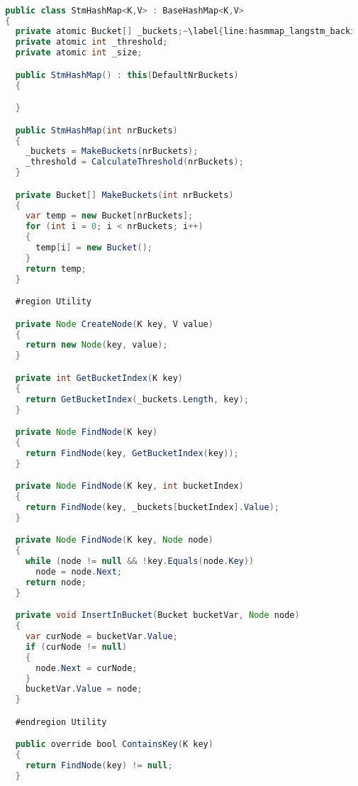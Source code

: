 \begin{lstlisting}[label=lst:impl_hasmap_lib,
  caption={\stmname Based Concurrent Hashmap Implementation},
  language=Java,  
  showspaces=false,
  showtabs=false,
  breaklines=true,
  showstringspaces=false,
  breakatwhitespace=true,
  commentstyle=\color{greencomments},
  keywordstyle=\color{bluekeywords},
  stringstyle=\color{redstrings},
  escapechar=~,
  morekeywords={atomic, retry, orelse, var, get, set, ref, out, readonly, virtual, override, region, endregion, foreach, lock}]  % Start your code-block

  public class StmHashMap<K,V> : BaseHashMap<K,V>
  {
    private atomic Bucket[] _buckets;~\label{line:hasmmap_langstm_backingarray}~
    private atomic int _threshold;
    private atomic int _size;

    public StmHashMap() : this(DefaultNrBuckets)
    {

    }

    public StmHashMap(int nrBuckets)
    {
      _buckets = MakeBuckets(nrBuckets);
      _threshold = CalculateThreshold(nrBuckets);
    }

    private Bucket[] MakeBuckets(int nrBuckets)
    {
      var temp = new Bucket[nrBuckets];
      for (int i = 0; i < nrBuckets; i++)
      {
        temp[i] = new Bucket();
      }
      return temp;
    }

    #region Utility

    private Node CreateNode(K key, V value)
    {
      return new Node(key, value);
    }

    private int GetBucketIndex(K key)
    {
      return GetBucketIndex(_buckets.Length, key);
    }

    private Node FindNode(K key)
    {
      return FindNode(key, GetBucketIndex(key));
    }

    private Node FindNode(K key, int bucketIndex)
    {
      return FindNode(key, _buckets[bucketIndex].Value);
    }

    private Node FindNode(K key, Node node)
    {
      while (node != null && !key.Equals(node.Key))
        node = node.Next;
      return node;
    }

    private void InsertInBucket(Bucket bucketVar, Node node)
    {
      var curNode = bucketVar.Value;
      if (curNode != null)
      {
        node.Next = curNode;
      }
      bucketVar.Value = node;
    }

    #endregion Utility

    public override bool ContainsKey(K key)
    {
      return FindNode(key) != null;
    }


\end{lstlisting}
